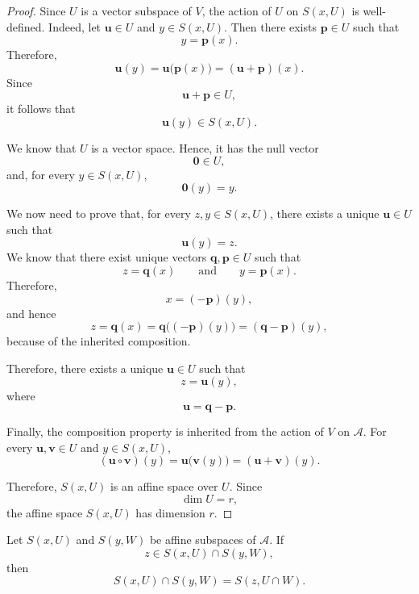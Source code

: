 \documentclass[12pt]{article}
\begin{document}
\begin{proof}
Since \(U\) is a vector subspace of \(V\), the action of \(U\) on
\(S(x,U)\) is well-defined. Indeed, let \(\mathbf{u}\in U\) and
\(y\in S(x,U)\). Then there exists \(\mathbf{p}\in U\) such that
\[
y=\mathbf{p}(x).
\]
Therefore,
\[
\mathbf{u}(y)
=
\mathbf{u}\bigl(\mathbf{p}(x)\bigr)
=
(\mathbf{u}+\mathbf{p})(x).
\]
Since
\[
\mathbf{u}+\mathbf{p}\in U,
\]
it follows that
\[
\mathbf{u}(y)\in S(x,U).
\]

We know that \(U\) is a vector space. Hence, it has the null vector
\[
\mathbf{0}\in U,
\]
and, for every \(y\in S(x,U)\),
\[
\mathbf{0}(y)=y.
\]

We now need to prove that, for every \(z,y\in S(x,U)\), there exists a
unique \(\mathbf{u}\in U\) such that
\[
\mathbf{u}(y)=z.
\]
We know that there exist unique vectors \(\mathbf{q},\mathbf{p}\in U\)
such that
\[
z=\mathbf{q}(x)
\qquad\text{and}\qquad
y=\mathbf{p}(x).
\]
Therefore,
\[
x=(-\mathbf{p})(y),
\]
and hence
\[
z
=
\mathbf{q}(x)
=
\mathbf{q}\bigl((-\mathbf{p})(y)\bigr)
=
(\mathbf{q}-\mathbf{p})(y),
\]
because of the inherited composition.

Therefore, there exists a unique \(\mathbf{u}\in U\) such that
\[
z=\mathbf{u}(y),
\]
where
\[
\mathbf{u}=\mathbf{q}-\mathbf{p}.
\]

Finally, the composition property is inherited from the action of \(V\)
on \(\mathcal A\). For every \(\mathbf{u},\mathbf{v}\in U\) and
\(y\in S(x,U)\),
\[
(\mathbf{u}\circ\mathbf{v})(y)
=
\mathbf{u}\bigl(\mathbf{v}(y)\bigr)
=
(\mathbf{u}+\mathbf{v})(y).
\]

Therefore, \(S(x,U)\) is an affine space over \(U\). Since
\[
\dim U=r,
\]
the affine space \(S(x,U)\) has dimension \(r\).
\end{proof}

\begin{proposition}
Let \(S(x,U)\) and \(S(y,W)\) be affine subspaces of \(\mathcal A\). If
\[
z\in S(x,U)\cap S(y,W),
\]
then
\[
S(x,U)\cap S(y,W)
=
S(z,U\cap W).
\]
\end{proposition}
\end{document}
